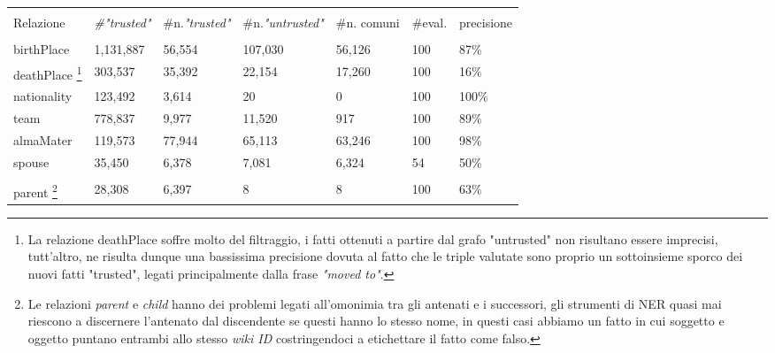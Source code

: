 \documentclass[10pt,a4paper,twocolumn]{article}
\begin{document}
\begin{table}[t]
	\centering
	\begin{minipage}{\textwidth}
	
		\begin{tabular}{lllllll}
		\hline \\
		Relazione & \textit{\#"trusted"} & \#n.\textit{"trusted"} & \#n.\textit{"untrusted"} & \#n. comuni & \#eval. & precisione \\
		\hline \\
		birthPlace           & 1,131,887            & 56,554                   & 107,030                    & 56,126       & 100        & 87\%       \\
		deathPlace \footnote{La relazione deathPlace soffre molto del filtraggio, i fatti ottenuti a partire dal grafo "untrusted" non risultano essere imprecisi, tutt'altro, ne risulta dunque una bassissima precisione dovuta al fatto che le triple valutate sono proprio un sottoinsieme sporco dei nuovi fatti "trusted", legati principalmente dalla frase \textit{"moved to"}.}           & 303,537              & 35,392                   & 22,154                     & 17,260       & 100        & 16\%       \\
		nationality          & 123,492              & 3,614                    & 20                         & 0            & 100        & 100\%      \\
		team                 & 778,837              & 9,977                    & 11,520                     & 917          & 100        & 89\%       \\
		almaMater           & 119,573              & 77,944                   & 65,113                     & 63,246       & 100        & 98\%       \\
		spouse               & 35,450               & 6,378                    & 7,081                      & 6,324        & 54         & 50\%       \\
		\hline \\
		parent \footnote{Le relazioni \textit{parent} e \textit{child} hanno dei problemi legati all'omonimia tra gli antenati e i successori, gli strumenti di NER quasi mai riescono a discernere l'antenato dal discendente se questi hanno lo stesso nome, in questi casi abbiamo un fatto in cui soggetto e oggetto puntano entrambi allo stesso \textit{wiki ID} costringendoci a etichettare il fatto come falso.}               & 28,308               & 6,397                    & 8                          & 8            & 100        & 63\%       \\

\end{tabular}
\end{minipage}
\end{table}
\end{document}
